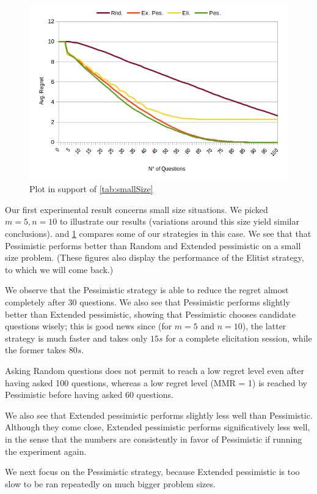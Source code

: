 \documentclass[sigconf, anonymous]{aamas}
\begin{document}
\begin{figure}
	\centering
	\includegraphics[width=.45\textwidth]{comparison.png}
	\caption{Plot in support of \cref{tab:smallSize}}
	\label{fig:smallSize}
\end{figure}

Our first experimental result concerns small size situations. We picked $m = 5, n = 10$ to illustrate our results (variations around this size yield similar conclusions). 
 and \cref{fig:smallSize} compares some of our strategies in this case.
We see that that Pessimistic performs better than Random and Extended pessimistic on a small size problem.
(These figures also display the performance of the Elitist strategy, to which we will come back.)

We observe that the Pessimistic strategy is able to reduce the regret almost completely after $30$ questions. We also see that Pessimistic performs slightly better than Extended pessimistic, showing that Pessimistic chooses candidate questions wisely; this is good news since (for $m = 5$ and $n = 10$), the latter strategy is much faster and takes only $15s$ for a complete elicitation session, while the former takes $80s$.

Asking Random questions does not permit to reach a low regret level even after having asked 100 questions, whereas a low regret level (MMR = 1) is reached by Pessimistic before having asked 60 questions.

We also see that Extended pessimistic performs slightly less well than Pessimistic. Although they come close, Extended pessimistic performs significatively less well, in the sense that the numbers are consistently in favor of Pessimistic if running the experiment again.

We next focus on the Pessimistic strategy, because Extended pessimistic is too slow to be ran repeatedly on much bigger problem sizes.
\end{document}

